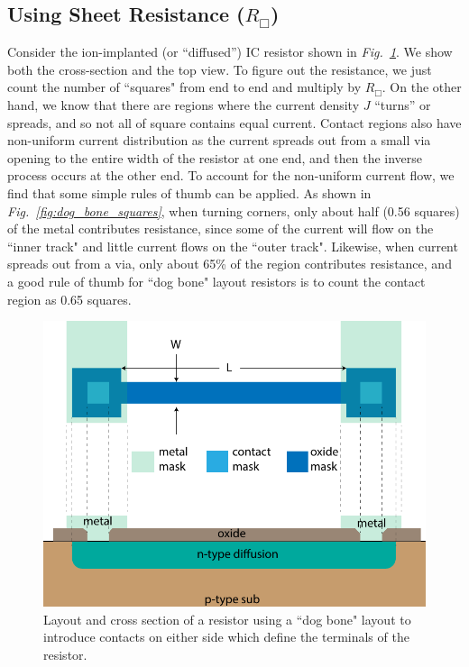 \subsection{Using Sheet Resistance (\texorpdfstring{$R_\Box$}{})}
Consider the ion-implanted (or “diffused”) IC resistor shown in \emph{Fig.~\ref{fig:diff_resistor_top}}.  We show both the cross-section and the top view.  To figure out the resistance, we just count the number of ``squares" from end to end and multiply by $R_\Box$.  On the other hand, we know that there are regions where the current density $J$ ``turns” or spreads, and so not all of square contains equal current.   Contact regions also have non-uniform current distribution as the current spreads out from a small via opening to the entire width of the resistor at one end, and then the inverse process occurs at the other end.  To account for the non-uniform current flow, we find that some simple rules of thumb can be applied.  As shown in \emph{Fig.~\ref{fig:dog_bone_squares}}, when turning corners, only about half (0.56 squares) of the metal contributes resistance, since some of the current will flow on the ``inner track" and little current flows on the ``outer track".  Likewise, when current spreads out from a via, only about 65\% of the region contributes resistance, and a good rule of thumb for ``dog bone" layout resistors is to count the contact region as 0.65 squares.
\begin{figure}[tb]
\centering
\includegraphics[width=.7\columnwidth]{diff_resistor_top}
\caption{Layout and cross section of a resistor using a ``dog bone" layout to introduce contacts on either side which define the terminals of the resistor.}
\label{fig:diff_resistor_top}
\end{figure}
